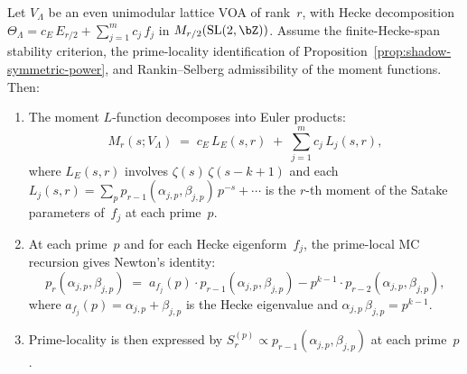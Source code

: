 \begin{theorem}%
\label{thm:hecke-newton-lattice}%
\ClaimStatusProvedHere%
%
%
Let $V_\Lambda$ be an even unimodular lattice VOA of rank~$r$,
with Hecke decomposition
$\Theta_\Lambda = c_E\,E_{r/2} + \sum_{j=1}^m c_j\,f_j$
in $M_{r/2}(\mathrm{SL}(2,\bZ))$. Assume the finite-Hecke-span
stability criterion, the prime-locality identification of
Proposition~\textup{\ref{prop:shadow-symmetric-power}}, and
Rankin--Selberg admissibility of the moment functions. Then:
\begin{enumerate}[label=\textup{(\roman*)}]
\item
The moment $L$-function decomposes into Euler products:
\begin{equation}\label{eq:moment-euler-lattice}
 M_r(s; V_\Lambda)
 \;=\;
 c_E\,L_E(s,r) \;+\; \sum_{j=1}^m c_j\,L_j(s,r),
\end{equation}
where $L_E(s,r)$ involves $\zeta(s)\,\zeta(s{-}k{+}1)$ and
each $L_j(s,r) = \sum_p p_{r-1}(\alpha_{j,p},\beta_{j,p})\,
p^{-s} + \cdots$ is the $r$-th moment of the Satake parameters
of~$f_j$ at each prime~$p$.
\item
At each prime~$p$ and for each Hecke eigenform~$f_j$, the
prime-local MC recursion gives Newton's identity:
\begin{equation}\label{eq:newton-at-prime}
 p_r(\alpha_{j,p}, \beta_{j,p})
 \;=\;
 a_{f_j}(p)\cdot p_{r-1}(\alpha_{j,p}, \beta_{j,p})
 - p^{k-1}\cdot p_{r-2}(\alpha_{j,p}, \beta_{j,p}),
\end{equation}
where $a_{f_j}(p) = \alpha_{j,p} + \beta_{j,p}$ is the Hecke
eigenvalue and $\alpha_{j,p}\,\beta_{j,p} = p^{k-1}$.
\item
Prime-locality is then expressed by
$S_r^{(p)} \propto
p_{r-1}(\alpha_{j,p}, \beta_{j,p})$ at each prime~$p$.
\end{enumerate}
\end{theorem}

